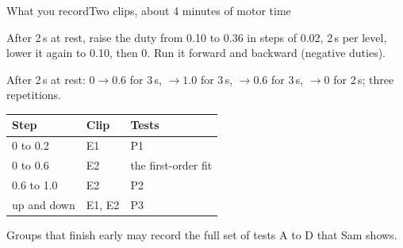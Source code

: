 %
\begin{frame}{What you record}{Two clips, about 4 minutes of motor time}
  \footnotesize
  \begin{description}\setlength{\itemsep}{4pt}
    \item[\textbf{E1, small duty}] After 2\,s at rest, raise the duty from 0.10 to 0.36 in steps of 0.02, 2\,s per level, lower it again to 0.10, then 0.
      Run it forward and backward (negative duties).
    \item[\textbf{E2, operating point}] After 2\,s at rest: $0 \to 0.6$ for 3\,s, $\to 1.0$ for 3\,s, $\to 0.6$ for 3\,s, $\to 0$ for 2\,s; three repetitions.
  \end{description}
  \vspace{4pt}
  \begin{center}
  \begin{tabular}{@{}lll@{}}
    \toprule
    Step & Clip & Tests \\
    \midrule
    0 to 0.2 & E1 & P1 \\
    0 to 0.6 & E2 & the first-order fit \\
    0.6 to 1.0 & E2 & P2 \\
    up and down & E1, E2 & P3 \\
    \bottomrule
  \end{tabular}
  \end{center}
  \vspace{2pt}
  {\scriptsize Groups that finish early may record the full set of tests A to D that Sam shows.}
\end{frame}

